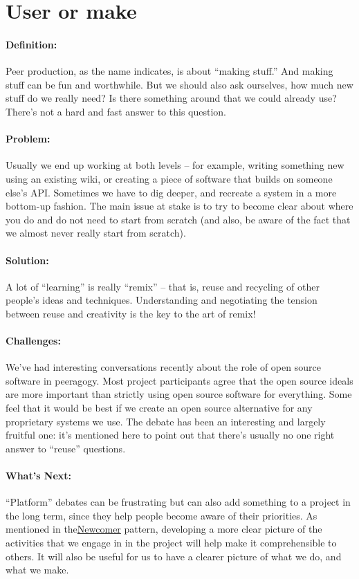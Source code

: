 \section{User or make}
\paragraph{Definition:} Peer production, as the name indicates, is about
``making stuff.'' And making stuff can be fun and worthwhile. But we
should also ask ourselves, how much new stuff do we really need? Is
there something around that we could already use? There's not a hard and
fast answer to this question.

\paragraph{Problem:} Usually we end up working at both levels -- for
example, writing something new using an existing wiki, or creating a
piece of software that builds on someone else's API. Sometimes we have
to dig deeper, and recreate a system in a more bottom-up fashion. The
main issue at stake is to try to become clear about where you do and do
not need to start from scratch (and also, be aware of the fact that we
almost never really start from scratch).

\paragraph{Solution:} A lot of ``learning'' is really ``remix'' -- that is,
reuse and recycling of other people's ideas and techniques.
Understanding and negotiating the tension between reuse and creativity
is the key to the art of remix!

\paragraph{Challenges:} We've had interesting conversations recently about
the role of open source software in peeragogy. Most project participants
agree that the open source ideals are more important than strictly using
open source software for everything. Some feel that it would be best if
we create an open source alternative for any proprietary systems we use.
The debate has been an interesting and largely fruitful one: it's
mentioned here to point out that there's usually no one right answer to
``reuse'' questions.

\paragraph{What's Next:} ``Platform'' debates can be frustrating but can
also add something to a project in the long term, since they help people
become aware of their priorities. As mentioned in
the\href{http://peeragogy.org/patterns/newcomer/}{Newcomer} pattern,
developing a more clear picture of the activities that we engage in in
the project will help make it comprehensible to others. It will also be
useful for us to have a clearer picture of what we do, and what we make.

